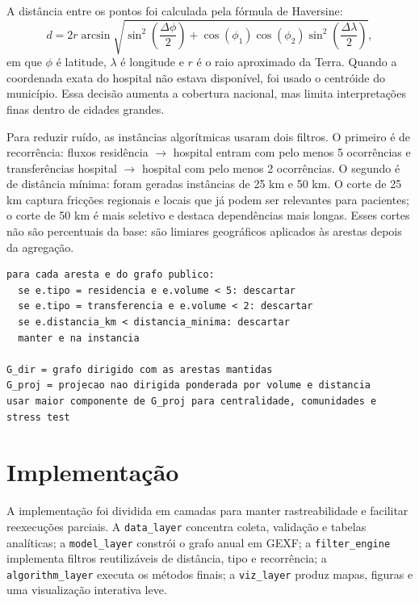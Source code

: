 \documentclass[10pt,a4paper]{article}
\begin{document}
A distância entre os pontos foi calculada pela fórmula de Haversine:
\begin{equation}
 d = 2r \arcsin \sqrt{
 \sin^2\left(\frac{\Delta \phi}{2}\right) +
 \cos(\phi_1)\cos(\phi_2)\sin^2\left(\frac{\Delta \lambda}{2}\right)
 },
\label{eq:haversine}
\end{equation}
em que $\phi$ é latitude, $\lambda$ é longitude e $r$ é o raio aproximado da Terra. Quando a coordenada exata do hospital não estava disponível, foi usado o centróide do município. Essa decisão aumenta a cobertura nacional, mas limita interpretações finas dentro de cidades grandes.

Para reduzir ruído, as instâncias algorítmicas usaram dois filtros. O primeiro é de recorrência: fluxos residência $\rightarrow$ hospital entram com pelo menos 5 ocorrências e transferências hospital $\rightarrow$ hospital com pelo menos 2 ocorrências. O segundo é de distância mínima: foram geradas instâncias de 25 km e 50 km. O corte de 25 km captura fricções regionais e locais que já podem ser relevantes para pacientes; o corte de 50 km é mais seletivo e destaca dependências mais longas. Esses cortes não são percentuais da base: são limiares geográficos aplicados às arestas depois da agregação.

\begin{lstlisting}[caption={Construção da instância analítica filtrada.}]
para cada aresta e do grafo publico:
  se e.tipo = residencia e e.volume < 5: descartar
  se e.tipo = transferencia e e.volume < 2: descartar
  se e.distancia_km < distancia_minima: descartar
  manter e na instancia

G_dir = grafo dirigido com as arestas mantidas
G_proj = projecao nao dirigida ponderada por volume e distancia
usar maior componente de G_proj para centralidade, comunidades e stress test
\end{lstlisting}

\section{Implementação}

A implementação foi dividida em camadas para manter rastreabilidade e facilitar reexecuções parciais. A \texttt{data\_layer} concentra coleta, validação e tabelas analíticas; a \texttt{model\_layer} constrói o grafo anual em GEXF; a \texttt{filter\_engine} implementa filtros reutilizáveis de distância, tipo e recorrência; a \texttt{algorithm\_layer} executa os métodos finais; a \texttt{viz\_layer} produz mapas, figuras e uma visualização interativa leve.
\end{document}
